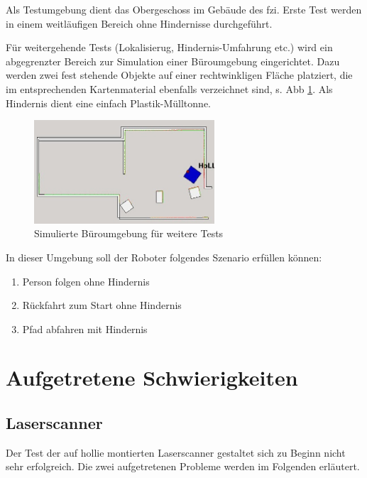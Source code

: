 Als Testumgebung dient das Obergeschoss im Gebäude des \gls{fzi}.
Erste Test werden in einem weitläufigen Bereich ohne Hindernisse durchgeführt.

Für weitergehende Tests (Lokalisierug, Hindernis-Umfahrung etc.) wird ein abgegrenzter Bereich zur Simulation einer Büroumgebung eingerichtet.
Dazu werden zwei fest stehende Objekte auf einer rechtwinkligen Fläche platziert, die im entsprechenden Kartenmaterial ebenfalls verzeichnet sind, s. Abb \ref{fig:map_fzi}.
Als Hindernis dient eine einfach Plastik-Mülltonne.

\begin{figure}[h]
	\centering
	\includegraphics[width=0.6\textwidth]{graphics/map_fzi}
	\caption{Simulierte Büroumgebung für weitere Tests}
	\label{fig:map_fzi}
\end{figure}

In dieser Umgebung soll der Roboter folgendes Szenario erfüllen können:
\begin{enumerate}
  \item Person folgen ohne Hindernis
  \item Rückfahrt zum Start ohne Hindernis
  \item Pfad abfahren mit Hindernis
\end{enumerate}



\section{Aufgetretene Schwierigkeiten}
\authorsection{\editortobias}

\subsection{Laserscanner}
\label{test_schwierigkeiten_laserscanner_sec}

Der Test der auf \gls{hollie} montierten Laserscanner gestaltet sich zu Beginn nicht sehr erfolgreich.
Die zwei aufgetretenen Probleme werden im Folgenden erläutert.

